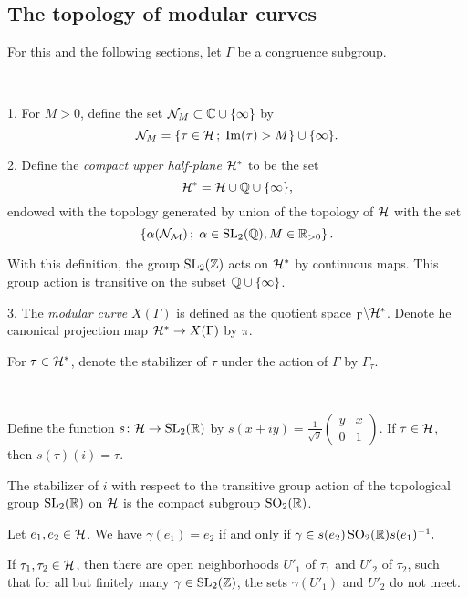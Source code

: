 \subsection{The topology of modular curves}

For this and the following sections, let $\Gamma$ be a congruence subgroup.

\begin{defi} \ 

  1. For $M>0$, define the set $\mathcal{N}_M \subset \mathbb{C}\cup\{\infty\}$ by
  \[\mathcal{N}_M=\left\{\tau\in\mathcal{H}\,;\; \operatorname{Im}(\tau)>M\right\}\cup\{\infty\}.\]

  2. Define the \emph{compact upper half-plane} $\mathcal{H}^*$ to be the set
  \[\mathcal{H}^*=\mathcal{H}\cup\mathbb{Q}\cup\{\infty\},\]
  endowed with the topology generated by union of the topology of $\mathcal{H}$ with the set
  \[\left\{\alpha(\mathcal{N_M})\,;\; \alpha\in\operatorname{SL}_2(\mathbb{Q}), M\in\mathbb{R}_{>0}\right\}.\]

  With this definition, the group $\operatorname{SL}_2(\mathbb{Z})$ acts on $\mathcal{H}^*$ by continuous maps. This group action is transitive on the subset $\mathbb{Q}\cup\{\infty\}$.

  3. The \emph{modular curve} $X(\Gamma)$ is defined as the quotient space $_\Gamma\backslash\mathcal{H}^*$. Denote he canonical projection map $\mathcal{H}^*\to X(\Gamma)$ by $\pi$.
\end{defi}

For $\tau\in\mathcal{H}^*$, denote the stabilizer of $\tau$ under the action of $\Gamma$ by $\Gamma_\tau$.

\begin{rmk}\label{pr:real-op} \ 

  Define the function $s\colon\mathcal{H}\to\operatorname{SL}_2(\mathbb{R})$ by $s(x+iy)=\frac{1}{\sqrt{y}}\left(\begin{smallmatrix}y & x \\ 0 & 1\end{smallmatrix}\right)$. If $\tau\in\mathcal{H}$, then $s(\tau)(i)=\tau$.
 
  The stabilizer of $i$ with respect to the transitive group action of the topological group $\operatorname{SL}_2(\mathbb{R})$ on $\mathcal{H}$ is the compact subgroup $\operatorname{SO}_2(\mathbb{R})$.
 
  Let $e_1,e_2\in\mathcal{H}$. We have $\gamma(e_1)=e_2$ if and only if $\gamma\in s(e_2)\operatorname{SO}_2(\mathbb{R})s(e_1)^{-1}.$
\end{rmk}

\begin{prop}
 If $\tau_1, \tau_2\in\mathcal{H}$, then there are open neighborhoods $U'_1$ of $\tau_1$ and $U'_2$ of $\tau_2$, such that for all but finitely many $\gamma\in\operatorname{SL}_2(\mathbb{Z})$, the sets $\gamma(U'_1)$ and $U'_2$ do not meet.
\end{prop}

